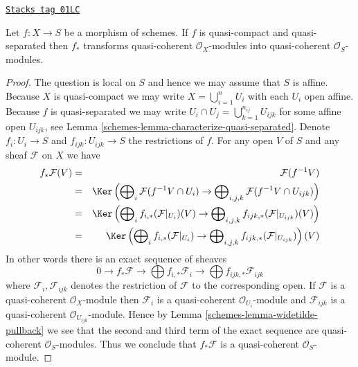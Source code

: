\begin{lemma}
\label{schemes-lemma-push-forward-quasi-coherent}
\href{https://stacks.math.columbia.edu/tag/01LC}{\texttt{Stacks tag 01LC}}

Let $f : X \to S$ be a morphism of schemes.
If $f$ is quasi-compact and quasi-separated then
$f_*$ transforms quasi-coherent $\mathcal{O}_X$-modules
into quasi-coherent $\mathcal{O}_S$-modules.
\end{lemma}

\begin{proof}

The question is local on $S$ and hence we may assume that
$S$ is affine. Because $X$ is quasi-compact we may write
$X = \bigcup_{i = 1}^n U_i$ with each $U_i$ open affine.
Because $f$ is quasi-separated we may write
$U_i \cap U_j = \bigcup_{k = 1}^{n_{ij}} U_{ijk}$ for some
affine open $U_{ijk}$, see Lemma \ref{schemes-lemma-characterize-quasi-separated}.
Denote $f_i : U_i \to S$ and $f_{ijk} : U_{ijk} \to S$ the
restrictions of $f$. For any open $V$ of $S$ and any sheaf
$\mathcal{F}$ on $X$ we have
\begin{eqnarray*}
f_*\mathcal{F}(V) & = & \mathcal{F}(f^{-1}V) \\
& = &
\Ker\left(
\bigoplus\nolimits_i \mathcal{F}(f^{-1}V \cap U_i)
\to
\bigoplus\nolimits_{i, j, k} \mathcal{F}(f^{-1}V \cap U_{ijk})\right) \\
& = &
\Ker\left(
\bigoplus\nolimits_i f_{i, *}(\mathcal{F}|_{U_i})(V)
\to
\bigoplus\nolimits_{i, j, k} f_{ijk, *}(\mathcal{F}|_{U_{ijk}})(V)\right) \\
& = &
\Ker\left(
\bigoplus\nolimits_i f_{i, *}(\mathcal{F}|_{U_i})
\to
\bigoplus\nolimits_{i, j, k} f_{ijk, *}(\mathcal{F}|_{U_{ijk}})\right)(V)
\end{eqnarray*}
In other words there is an exact sequence of sheaves
$$
0 \to f_*\mathcal{F}
\to \bigoplus f_{i, *}\mathcal{F}_i
\to \bigoplus f_{ijk, *}\mathcal{F}_{ijk}
$$
where $\mathcal{F}_i, \mathcal{F}_{ijk}$ denotes the
restriction of $\mathcal{F}$ to the corresponding open.
If $\mathcal{F}$ is a quasi-coherent $\mathcal{O}_X$-module
then $\mathcal{F}_i$ is a quasi-coherent $\mathcal{O}_{U_i}$-module
and $\mathcal{F}_{ijk}$ is a quasi-coherent $\mathcal{O}_{U_{ijk}}$-module.
Hence by Lemma \ref{schemes-lemma-widetilde-pullback} we see that the second and
third term of the exact sequence are quasi-coherent
$\mathcal{O}_S$-modules. Thus we conclude that
$f_*\mathcal{F}$ is a quasi-coherent $\mathcal{O}_S$-module.
\end{proof}

